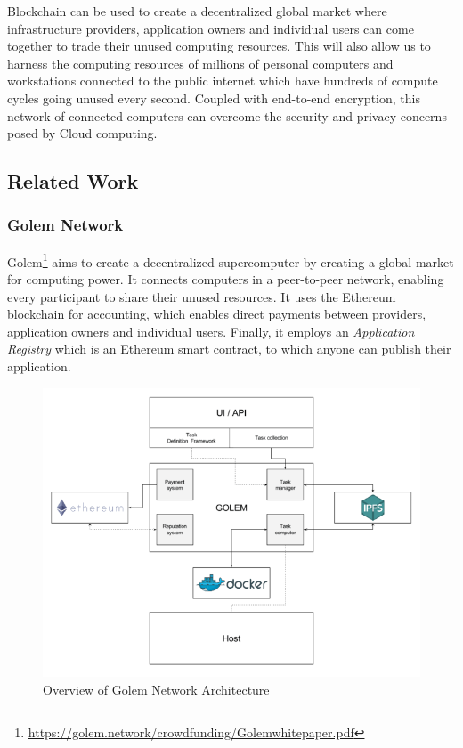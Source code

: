 	Blockchain can be used to create a decentralized global market where infrastructure providers,  application owners and individual users can come together to trade their unused computing resources. This will also allow us to harness the computing resources of millions of personal computers and workstations connected to the public internet which have hundreds of compute cycles going unused every second\cite{crowcroft2003peer}. Coupled with end-to-end encryption, this network of connected computers can overcome the security and privacy concerns posed by Cloud computing.
	
	\subsection{Related Work}
		\subsubsection{Golem Network}
		Golem\footnote{\url{https://golem.network/crowdfunding/Golemwhitepaper.pdf}} aims to create a decentralized supercomputer by creating a global market for computing power. It connects computers in a peer-to-peer network, enabling every participant to share their unused resources. It uses the Ethereum blockchain for accounting, which enables direct payments between providers, application owners and individual users. Finally, it employs an \textit{Application Registry} which is an Ethereum smart contract, to which anyone can publish their application.
		
		\begin{figure}[h]
			\centering
			\includegraphics[width=\linewidth]{figures/golem-network}
			\caption{\label{fig:golem-network} Overview of Golem Network Architecture\protect\footnotemark}
		\end{figure}
	
